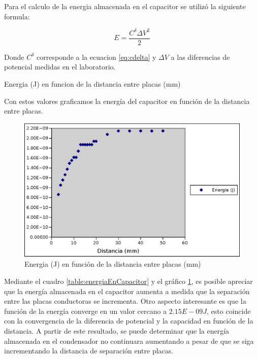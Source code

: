 \documentclass{article}
\begin{document}
Para el calculo de la energia almacenada en el capacitor se utilizó la siguiente formula:

\begin{equation}
    E = \frac{C^{\delta} \Delta V^{2}}{2} 
\end{equation}

Donde $C^{\delta}$ corresponde a la ecuacion \ref{eq:cdelta} y $\Delta V$ a las diferencias de potencial medidas en 
el laboratorio.

    
    \begin{table}[H]
	\centering
    
    \caption{Energia (J) en funcion de la distancia entre placas (mm)}
    \label{table:energiaEnCapacitor}
    \end{table}

    Con estos valores graficamos la energía del capacitor en función de la distancia entre placas.
   
    \begin{figure}[H]
    \centering
    \includegraphics[scale=0.67]{energia_en_capacitor.eps}
    \caption{Energia (J) en función de la distancia entre placas (mm)}
    \label{fig:energiaEnCapacitorGrafico}
    \end{figure}

    Mediante el cuadro \ref{table:energiaEnCapacitor} y el gráfico \ref{fig:energiaEnCapacitorGrafico}, es posible apreciar que la energía almacenada en el capacitor aumenta a medida que la separación entre las placas conductoras se incrementa. Otro aspecto interesante es que la función de la energía converge en un valor cercano a $2.15E-09 J$, esto coincide con la convergencia de la diferencia de potencial y la capacidad en función de la distancia. A partir de este resultado, se puede determinar que la energía almacenada en el condensador no continuara aumentando a pesar de que se siga incrementando la distancia de separación entre placas. 
\end{document}
